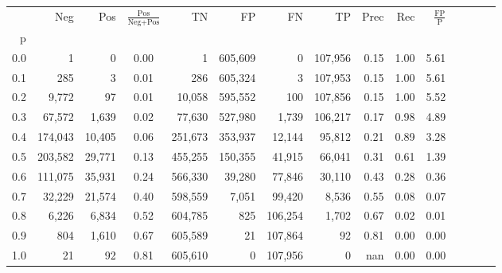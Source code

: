 \begin{tabular}{rrrcrrrrrrrrrrr}
\toprule
{} &      Neg &     Pos & $\frac{\text{Pos}}{\text{Neg}+\text{Pos}}$ &       TN &       FP &       FN &       TP &  Prec &   Rec & $\frac{\text{FP}}{\text{P}}$ \\
p   &          &         &                                            &          &          &          &          &       &       &                              \\
\midrule
0.0 &        1 &       0 &                                       0.00 &        1 &  605,609 &        0 &  107,956 &  0.15 &  1.00 &                         5.61 \\
0.1 &      285 &       3 &                                       0.01 &      286 &  605,324 &        3 &  107,953 &  0.15 &  1.00 &                         5.61 \\
0.2 &    9,772 &      97 &                                       0.01 &   10,058 &  595,552 &      100 &  107,856 &  0.15 &  1.00 &                         5.52 \\
0.3 &   67,572 &   1,639 &                                       0.02 &   77,630 &  527,980 &    1,739 &  106,217 &  0.17 &  0.98 &                         4.89 \\
0.4 &  174,043 &  10,405 &                                       0.06 &  251,673 &  353,937 &   12,144 &   95,812 &  0.21 &  0.89 &                         3.28 \\
0.5 &  203,582 &  29,771 &                                       0.13 &  455,255 &  150,355 &   41,915 &   66,041 &  0.31 &  0.61 &                         1.39 \\
0.6 &  111,075 &  35,931 &                                       0.24 &  566,330 &   39,280 &   77,846 &   30,110 &  0.43 &  0.28 &                         0.36 \\
0.7 &   32,229 &  21,574 &                                       0.40 &  598,559 &    7,051 &   99,420 &    8,536 &  0.55 &  0.08 &                         0.07 \\
0.8 &    6,226 &   6,834 &                                       0.52 &  604,785 &      825 &  106,254 &    1,702 &  0.67 &  0.02 &                         0.01 \\
0.9 &      804 &   1,610 &                                       0.67 &  605,589 &       21 &  107,864 &       92 &  0.81 &  0.00 &                         0.00 \\
1.0 &       21 &      92 &                                       0.81 &  605,610 &        0 &  107,956 &        0 &   nan &  0.00 &                         0.00 \\
\bottomrule
\end{tabular}
